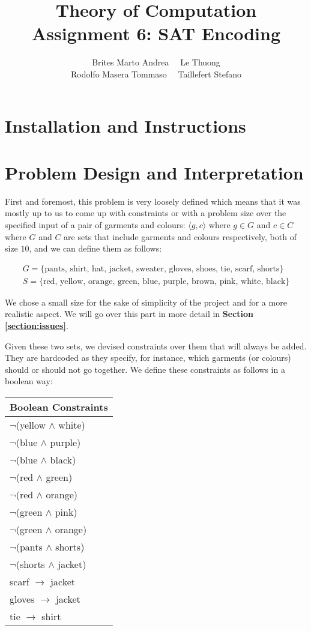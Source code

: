 \documentclass[12pt]{article}
\title{Theory of Computation \\ Assignment 6: SAT Encoding}
\author{Brites Marto Andrea \ \ Le Thuong \\ Rodolfo Masera Tommaso \ \ Taillefert Stefano}
\date{}
\newcommand{\mygather}[1]{\begin{gather*} #1 \end{gather*}}
\begin{document}
\maketitle

\section{Installation and Instructions}

\section{Problem Design and Interpretation}

First and foremost, this problem is very loosely defined which means that it was mostly up to us to come up with constraints or with a problem size over the specified input of a pair of garments and colours: $\langle g, c \rangle$ where $g \in G$ and $c \in C$ where $G$ and $C$ are sets that include garments and colours respectively, both of size $10$, and we can define them as follows:

\mygather{
	G = \{\text{pants, shirt, hat, jacket, sweater, gloves, shoes, tie, scarf, shorts} \} \\
	S = \{\text{red, yellow, orange, green, blue, purple, brown, pink, white, black} \}
}

We chose a small size for the sake of simplicity of the project and for a more realistic aspect. We will go over this part in more detail in \textbf{Section \ref{section:issues}}.

Given these two sets, we devised constraints over them that will always be added. They are hardcoded as they specify, for instance, which garments (or colours) should or should not go together.
We define these constraints as follows in a boolean way:

\begin{center}
\begin{tabular}{|l|}
\hline
Boolean Constraints \\
\hline
$\neg$(yellow $\wedge$ white) \\[0.1cm]
$\neg$(blue $\wedge$ purple) \\[0.1cm]
$\neg$(blue $\wedge$ black) \\[0.1cm]
$\neg$(red $\wedge$ green) \\[0.1cm]
$\neg$(red $\wedge$ orange) \\[0.1cm]
$\neg$(green $\wedge$ pink) \\[0.1cm]
$\neg$(green $\wedge$ orange) \\[0.1cm]
$\neg$(pants $\wedge$ shorts) \\[0.1cm]
$\neg$(shorts $\wedge$ jacket) \\[0.1cm]
scarf $\rightarrow$ jacket \\[0.1cm]
gloves $\rightarrow$ jacket \\[0.1cm]
tie $\rightarrow$ shirt \\
\hline
\end{tabular}
\end{center}
\end{document}
